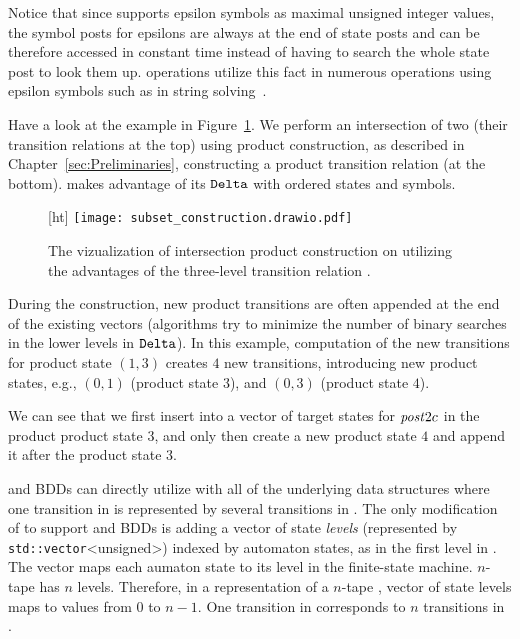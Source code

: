 Notice that since \mata supports epsilon symbols as maximal unsigned integer values, the symbol posts for epsilons are always at the end of state posts and can be therefore accessed in constant time instead of having to search the whole state post to look them up. \mata operations utilize this fact in numerous operations using epsilon symbols such as in string solving~\cite{fm23_equations_synergy_regular_constraints_DBLP:conf/fm/BlahoudekCCHHLS23}.

\begin{example}
  Have a look at the example in Figure~\ref{fig:delta_struct_product_construction}.
  We perform an intersection of two \nfas (their transition relations at the top) using product construction, as described in Chapter~\ref{sec:Preliminaries}, constructing a product transition relation (at the bottom).
  \mata makes advantage of its $\mathtt{Delta}$ with ordered states and symbols.

  \begin{figure}
    [ht]
    \centering
  \texttt{[image: subset\_construction.drawio.pdf]}
  \caption{
  The vizualization of intersection product construction on \nfas utilizing the advantages of the three-level transition relation \deltastruct.
  }
  \label{fig:delta_struct_product_construction}
  \end{figure}

  During the construction, new product transitions are often appended at the end of the existing vectors (algorithms try to minimize the number of binary searches in the lower levels in $\mathtt{Delta}$).
  In this example, computation of the new transitions for product state $(1, 3)$ creates $4$ new transitions, introducing new product states, e.g., $(0, 1)$ (product state $3$), and $(0, 3)$ (product state $4$).

  We can see that we first insert into a vector of target states for $\mathit{post}{2}{c}$ in the product product state $3$, and only then create a new product state $4$ and append it after the product state $3$.
\end{example}

\nfts and BDDs can directly utilize \nfaClass with all of the underlying data structures where one transition in \nft is represented by several transitions in \nfaClass.
The only modification of \nfaClass to support \nfts and BDDs is adding a vector of state \emph{levels} (represented by \texttt{std::vector}<unsigned>) indexed by automaton states, as in the first level in \deltastruct. The vector maps each aumaton state to its level in the finite-state machine.
$n$-tape \nft has $n$ levels.
Therefore, in a representation of a $n$-tape \nft, vector of state levels maps to values from $0$ to $n-1$.
One transition in \nft corresponds to $n$ transitions in \nfaClass.

